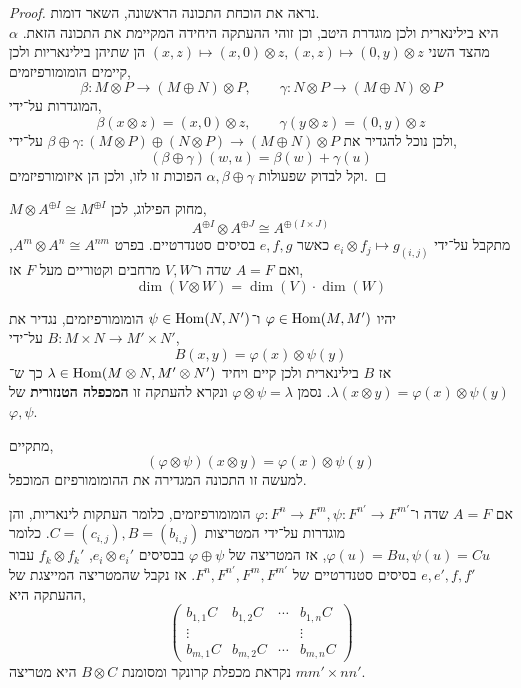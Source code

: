 \begin{proof}
	נראה את הוכחת התכונה הראשונה, השאר דומות. \\
	$\alpha$ היא בילינארית ולכן מוגדרת היטב, וכן זוהי ההעתקה היחידה המקיימת את התכונה הזאת.
	מהצד השני $(x, z) \mapsto (x, 0) \otimes z, (x, z) \mapsto (0, y) \otimes z$ הן שתיהן בילינאריות ולכן קיימים הומומורפיזמים,
	\[
		\beta : M \otimes P \to (M \oplus N) \otimes P,
		\qquad
		\gamma : N \otimes P \to (M \oplus N) \otimes P
	\]
	המוגדרות על־ידי,
	\[
		\beta(x \otimes z)
		= (x, 0) \otimes z,
		\qquad
		\gamma(y \otimes z)
		= (0, y) \otimes z
	\]
	ולכן נוכל להגדיר את $\beta \oplus \gamma : (M \otimes P) \oplus (N \otimes P) \to (M \oplus N) \otimes P$ על־ידי,
	\[
		(\beta \oplus \gamma)(w, u)
		= \beta(w) + \gamma(u)
	\]
	וקל לבדוק שפעולות $\alpha, \beta \oplus \gamma$ הפוכות זו לזו, ולכן הן איזומורפיזמים.
\end{proof}
\begin{example}
	$M \otimes A^{\oplus I} \cong M^{\oplus I}$ מחוק הפילוג, לכן,
	\[
		A^{\oplus I} \otimes A^{\oplus J}
		\cong A^{\oplus (I \times J)}
	\]
	מתקבל על־ידי $e_i \otimes f_j \mapsto g_{(i, j)}$ כאשר $e, f, g$ בסיסים סטנדרטיים.
	בפרט $A^m \otimes A^n \cong A^{n m}$, ואם $A = F$ שדה ו־$V, W$ מרחבים וקטוריים מעל $F$ אז,
	\[
		\dim(V \otimes W)
		= \dim(V) \cdot \dim(W)
	\]
\end{example}
\begin{definition}
	יהיו $\varphi \in \operatorname{Hom}(M, M')$ ו־$\psi \in \operatorname{Hom}(N, N')$ הומומורפיזמים,
	נגדיר את $B : M \times N \to M' \times N'$ על־ידי,
	\[
		B(x, y)
		= \varphi(x) \otimes \psi(y)
	\]
	אז $B$ בילינארית ולכן קיים ויחיד $\lambda \in \operatorname{Hom}(M \otimes N, M' \otimes N')$ כך ש־$\lambda(x \otimes y) = \varphi(x) \otimes \psi(y)$.
	נסמן $\varphi \otimes \psi = \lambda$ ונקרא להעתקה זו \textbf{המכפלה הטנזורית} של $\varphi, \psi$.
\end{definition}
\begin{remark}
	מתקיים,
	\[
		(\varphi \otimes \psi)(x \otimes y)
		= \varphi(x) \otimes \psi(y)
	\]
	למעשה זו התכונה המגדירה את ההומומורפיזם המוכפל.
\end{remark}
\begin{example}
	אם $A = F$ שדה ו־$\varphi : F^n \to F^m, \psi : F^{n'} \to F^{m'}$ הומומורפיזמים, כלומר העתקות לינאריות, והן מוגדרות על־ידי המטריצות $C = ( c_{i, j} ), B = ( b_{i, j} )$.
	כלומר $\varphi(u) = B u, \psi(u) = C u$, אז המטריצה של $\varphi \oplus \psi$ בבסיסים $e_i \otimes e_i'$, $f_k \otimes f_k'$ עבור $e, e', f, f'$ בסיסים סטנדרטיים של $F^n, F^{n'}, F^m, F^{m'}$.
	אז נקבל שהמטריצה המייצגת של ההעתקה היא,
	\[
		\begin{pmatrix}
			b_{1, 1} C & b_{1, 2} C & \cdots & b_{1, n} C \\
			\vdots & & & \vdots \\
			b_{m, 1} C & b_{m, 2} C & \cdots & b_{m, n} C
		\end{pmatrix}
	\]
	נקראת מכפלת קרונקר ומסומנת $B \otimes C$ היא מטריצה $m m' \times n n'$.
\end{example}

